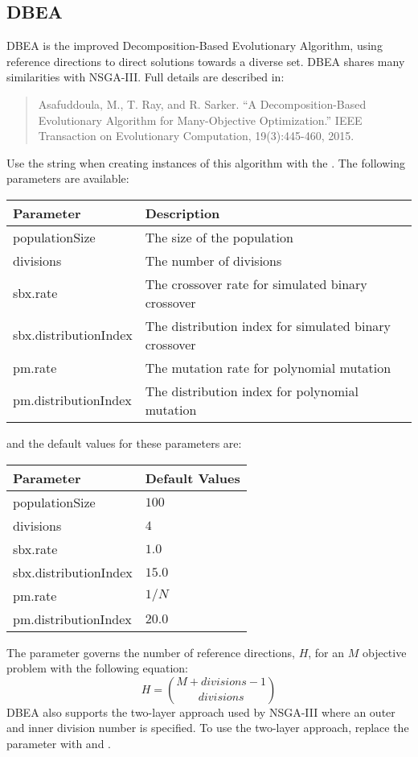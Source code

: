 \subsection{DBEA}
DBEA is the improved Decomposition-Based Evolutionary Algorithm, using reference directions to direct solutions towards a diverse set.  DBEA shares many similarities with NSGA-III.  Full details are described in:
\begin{quote}
Asafuddoula, M., T. Ray, and R. Sarker.  ``A Decomposition-Based Evolutionary Algorithm for Many-Objective Optimization.''  IEEE Transaction on Evolutionary Computation, 19(3):445-460, 2015.
\end{quote}
Use the string  when creating instances of this algorithm with the .  The following parameters are available:
\newline
\newline
\begin{tabularx}{\linewidth}{lX}
  \hline
  Parameter & Description \\
  \hline
  populationSize & The size of the population \\
  divisions & The number of divisions \\
  sbx.rate & The crossover rate for simulated binary crossover \\
  sbx.distributionIndex & The distribution index for simulated binary crossover \\
  pm.rate & The mutation rate for polynomial mutation \\
  pm.distributionIndex & The distribution index for polynomial mutation \\
  \hline
\end{tabularx}
\newline
\newline
and the default values for these parameters are:
\newline
\newline
\begin{tabularx}{\linewidth}{lX}
  \hline
  Parameter & Default Values \\
  \hline
  populationSize & $100$ \\
  divisions & $4$ \\
  sbx.rate & $1.0$ \\
  sbx.distributionIndex & $15.0$ \\
  pm.rate & $1/N$ \\
  pm.distributionIndex & $20.0$ \\
  \hline
\end{tabularx}
\newline
\newline
The  parameter governs the number of reference directions, $H$, for an $M$ objective problem with the following equation:
\begin{equation}
  H = {M+divisions-1 \choose divisions}
\end{equation}
DBEA also supports the two-layer approach used by NSGA-III where an outer and inner division number is specified.  To use the two-layer approach, replace the  parameter with  and .

